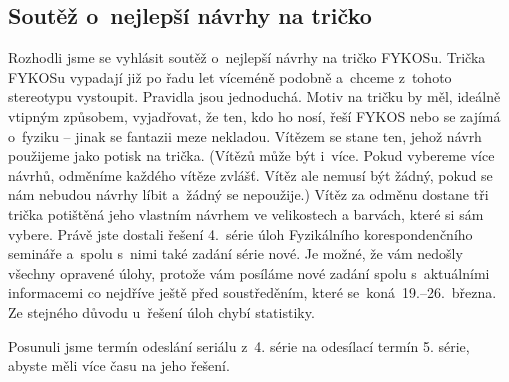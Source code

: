 \subsection{Soutěž o~nejlepší návrhy na tričko}
Rozhodli jsme se vyhlásit soutěž o~nejlepší návrhy na tričko FYKOSu.
Trička FYKOSu vypadají již po řadu let víceméně podobně a~chceme
z~tohoto stereotypu vystoupit. Pravidla jsou jednoduchá.
Motiv na tričku by měl, ideálně vtipným způsobem, vyjadřovat, že 
ten, kdo ho nosí, řeší FYKOS nebo se zajímá o~fyziku -- jinak se 
fantazii meze nekladou. Vítězem se stane 
ten, jehož návrh použijeme jako potisk na trička. (Vítězů může být 
i~více. Pokud vybereme více návrhů, odměníme každého vítěze zvlášť.
Vítěz ale nemusí být žádný, pokud se nám nebudou návrhy líbit a~žádný
se nepoužije.) Vítěz za odměnu dostane tři trička potištěná
jeho vlastním návrhem ve velikostech a barvách, které si sám vybere.
Právě jste dostali řešení 4.~série úloh Fyzikálního korespondenčního 
semináře a~spolu s~nimi také zadání série nové. Je možné, že vám 
nedošly všechny opravené úlohy, protože vám posíláme 
nové zadání spolu s~aktuálními informacemi co nejdříve ještě před 
soustředěním, které se~koná~19.--26.~března. Ze stejného důvodu 
u~řešení úloh chybí statistiky.
 
Posunuli jsme termín odeslání seriálu z~4. série na odesílací termín
5. série, abyste měli více času na jeho řešení.

\signature{KOLAR}
